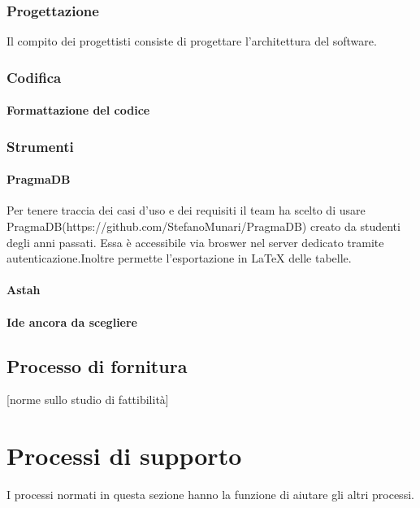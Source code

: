 	\subsubsection{Progettazione}
	Il compito dei progettisti consiste di progettare l'architettura del software. %
	
	\subsubsection{Codifica}
		\paragraph{Formattazione del codice}
	\subsubsection{Strumenti}
		\paragraph{PragmaDB}
		Per tenere traccia dei casi d'uso e dei requisiti il team ha scelto di usare PragmaDB(https://github.com/StefanoMunari/PragmaDB) creato da studenti degli anni passati. Essa è accessibile via broswer nel server dedicato tramite autenticazione.Inoltre permette l'esportazione in \LaTeX{} delle tabelle.
		\paragraph{Astah}
		\paragraph{Ide ancora da scegliere}

\subsection{Processo di fornitura}

[norme sullo studio di fattibilità]

\section{Processi di supporto}
I processi normati in questa sezione hanno la funzione di aiutare gli altri processi.

